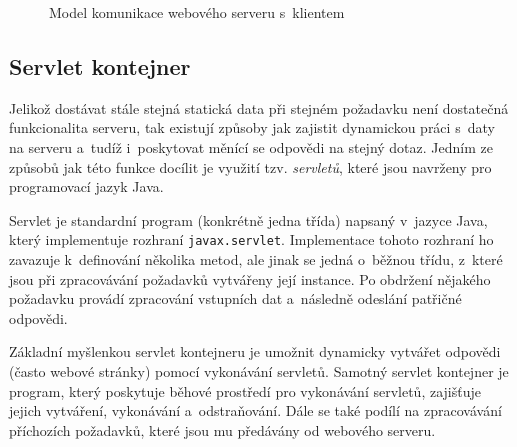            \begin{figure}[ht]
                \begin{center}
                    \caption{Model komunikace webového serveru s~klientem \cite{webserverVsServletPage}}
                    \label{imgWebserver}
                \end{center}
            \end{figure}    %

        \subsection{Servlet kontejner} \label{servletKontejner}
            Jelikož dostávat stále stejná statická data při stejném požadavku není dostatečná funkcionalita serveru,
            tak existují způsoby jak zajistit dynamickou práci s~daty na serveru a~tudíž i~poskytovat
            měnící se odpovědi na stejný dotaz.
            Jedním ze způsobů jak této funkce docílit je využití tzv. \emph{servletů},
            které jsou navrženy pro programovací jazyk Java.

            Servlet je standardní program (konkrétně jedna třída) napsaný v~jazyce Java, 
            který implementuje rozhraní \texttt{javax.servlet}.
            Implementace tohoto rozhraní ho zavazuje k~definování několika metod, ale jinak se jedná o~běžnou
            třídu, z~které jsou při zpracovávání požadavků vytvářeny její instance. Po obdržení nějakého
            požadavku provádí zpracování vstupních dat a~následně odeslání patřičné odpovědi.

            Základní myšlenkou servlet kontejneru je umožnit dynamicky vytvářet odpovědi (často webové stránky)
            pomocí vykonávání servletů. Samotný servlet kontejner je program, který poskytuje běhové prostředí pro vykonávání servletů,
            zajišťuje jejich vytváření, vykonávání a~odstraňování. Dále se také podílí na zpracovávání příchozích požadavků, které jsou
            mu předávány od webového serveru. 

